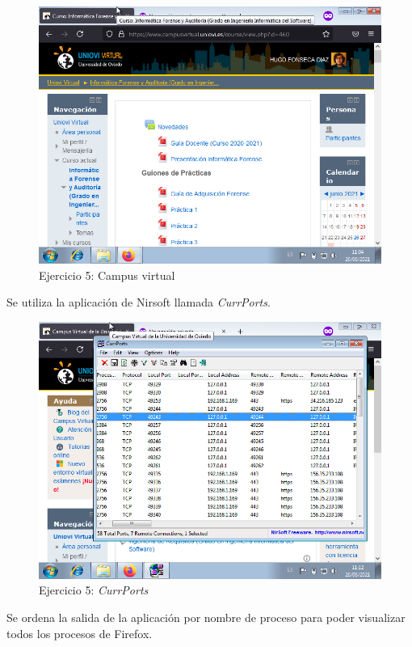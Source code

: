 \documentclass[11pt]{article}
\begin{document}
\begin{figure}[H]
  \caption{Ejercicio 5: Campus virtual}
  \centering
    \includegraphics[scale=0.7]{p05/e5-1.png}
\end{figure}

Se utiliza la aplicación de Nirsoft llamada \textit{CurrPorts}.

\begin{figure}[H]
    \caption{Ejercicio 5: \textit{CurrPorts}}
  \centering
    \includegraphics[scale=0.7]{p05/e5-2.png}
\end{figure}

Se ordena la salida de la aplicación por nombre de proceso para poder visualizar todos los procesos de Firefox.
\end{document}
